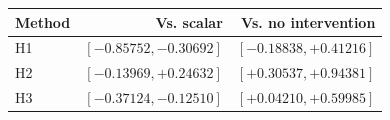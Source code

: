 \begin{tabular}{lrr}
\toprule
Method & Vs. scalar & Vs. no intervention \\
\midrule
H1 & $[-0.85752, -0.30692]$ & $[-0.18838, +0.41216]$ \\
H2 & $[-0.13969, +0.24632]$ & $[+0.30537, +0.94381]$ \\
H3 & $[-0.37124, -0.12510]$ & $[+0.04210, +0.59985]$ \\
\bottomrule
\end{tabular}
